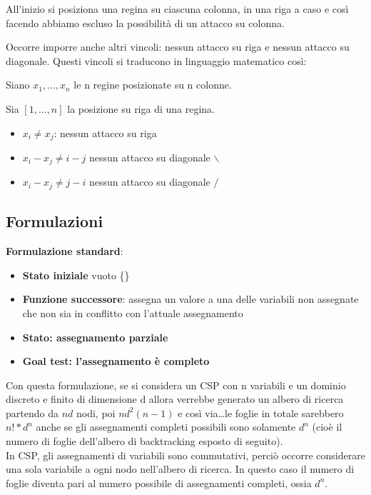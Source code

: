 All'inizio si posiziona una regina su ciascuna colonna, in una riga a caso e
così facendo abbiamo escluso la possibilità di un attacco su colonna.

Occorre imporre anche altri vincoli: nessun attacco su riga e nessun attacco su
diagonale. Questi vincoli si traducono in linguaggio matematico così:

Siano $x_1,...,x_n$ le n regine posizionate su n colonne.

Sia $[1,...,n]$ la posizione su riga di una regina.

\begin{itemize}
 \item $x_i \neq x_j$: nessun attacco su riga
 \item $x_i - x_j \neq i-j$ nessun attacco su diagonale $\backslash$
 \item $x_i - x_j \neq j-i$ nessun attacco su diagonale $/$
\end{itemize}

\subsection{Formulazioni}

\textbf{Formulazione standard}:

\begin{itemize}
 \item \textbf{Stato iniziale} vuoto \{\}
 \item \textbf{Funzione successore}: assegna un valore a una delle
variabili non assegnate che non sia in conflitto con l'attuale assegnamento
 \item \textbf{Stato: assegnamento parziale}
 \item \textbf{Goal test: l'assegnamento è completo}
\end{itemize}

Con questa formulazione, se si considera un CSP con n variabili e un dominio
discreto e finito di dimensione d allora verrebbe generato un albero di ricerca
partendo da $nd$ nodi, poi $nd^2(n-1)$ e così via\dots le foglie in totale
sarebbero $n!*d^n$ anche se gli assegnamenti completi possibili sono solamente
$d^n$ (cioè il numero di foglie dell'albero di backtracking esposto di
seguito).\\

In CSP, gli assegnamenti di variabili sono commutativi, perciò occorre
considerare una sola variabile a ogni nodo nell'albero di ricerca.
In questo caso il numero di foglie diventa pari al numero possibile di
assegnamenti completi, ossia $d^n$.

